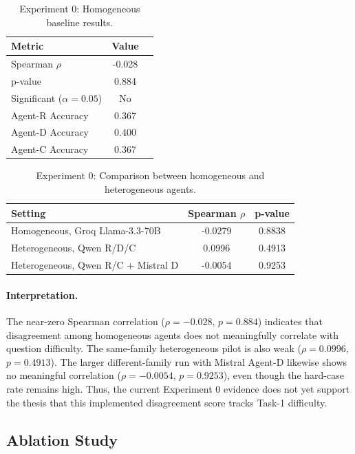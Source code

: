 \documentclass{article}
\begin{document}
\begin{table}[h]
\centering
\caption{Experiment 0: Homogeneous baseline results.}
\label{tab:exp0_homogeneous}
\begin{tabular}{lcc}
\toprule
\textbf{Metric} & \textbf{Value} \\
\midrule
Spearman $\rho$ & -0.028 \\
p-value & 0.884 \\
Significant ($\alpha=0.05$) & No \\
\midrule
Agent-R Accuracy & 0.367 \\
Agent-D Accuracy & 0.400 \\
Agent-C Accuracy & 0.367 \\
\bottomrule
\end{tabular}
\end{table}
\begin{table}[h]
\centering
\caption{Experiment 0: Comparison between homogeneous and heterogeneous agents.}
\label{tab:exp0_comparison}
\begin{tabular}{lcc}
\toprule
\textbf{Setting} & \textbf{Spearman $\rho$} & \textbf{p-value} \\
\midrule
Homogeneous, Groq Llama-3.3-70B & -0.0279 & 0.8838 \\
Heterogeneous, Qwen R/D/C & 0.0996 & 0.4913 \\
Heterogeneous, Qwen R/C + Mistral D & -0.0054 & 0.9253 \\
\bottomrule
\end{tabular}
\end{table}
\paragraph{Interpretation.}
The near-zero Spearman correlation ($\rho = -0.028$, $p = 0.884$) indicates that disagreement among homogeneous agents does not meaningfully correlate with question difficulty. The same-family heterogeneous pilot is also weak ($\rho = 0.0996$, $p = 0.4913$). The larger different-family run with Mistral Agent-D likewise shows no meaningful correlation ($\rho = -0.0054$, $p = 0.9253$), even though the hard-case rate remains high. Thus, the current Experiment 0 evidence does not yet support the thesis that this implemented disagreement score tracks Task-1 difficulty.

\subsection{Ablation Study}
\end{document}
